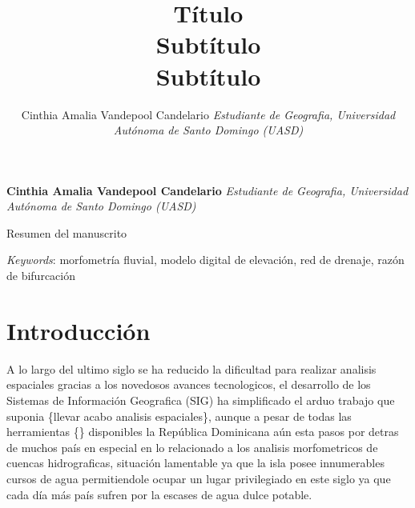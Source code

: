 \documentclass[11pt,]{article}
\title{Título\\
Subtítulo\\
Subtítulo  }
\author{\Large Cinthia Amalia Vandepool Candelario\vspace{0.05in} \newline\normalsize\emph{Estudiante de Geografia, Universidad Autónoma de Santo Domingo (UASD)}  }
\date{}
\newcommand*{\authorfont}{\fontfamily{phv}\selectfont}
\renewenvironment{abstract}
 {{%
    \setlength{\leftmargin}{0mm}
    \setlength{\rightmargin}{\leftmargin}%
  }%
  \relax}
 {\endlist}
\begin{document}
	
%

{%
\setlength{\parindent}{0pt}
\thispagestyle{plain}
{\fontsize{18}{20}\selectfont\raggedright 
\maketitle  %

}

{
   \vskip 13.5pt\relax \normalsize\fontsize{11}{12} 
\textbf{\authorfont Cinthia Amalia Vandepool Candelario} \hskip 15pt \emph{\small Estudiante de Geografia, Universidad Autónoma de Santo Domingo (UASD)}   

}

}








\begin{abstract}

    \hbox{\vrule height .2pt width 39.14pc}

    \vskip 8.5pt %

\noindent Resumen del manuscrito


\vskip 8.5pt \noindent \emph{Keywords}: morfometría fluvial, modelo digital de elevación, red de drenaje, razón
de bifurcación \par

    \hbox{\vrule height .2pt width 39.14pc}



\end{abstract}


\vskip 6.5pt


\noindent  \section{Introducción}\label{introducciuxf3n}

A lo largo del ultimo siglo se ha reducido la dificultad para realizar
analisis espaciales gracias a los novedosos avances tecnologicos, el
desarrollo de los Sistemas de Información Geografica (SIG) ha
simplificado el arduo trabajo que suponia \{llevar acabo analisis
espaciales\}, aunque a pesar de todas las herramientas \{\} disponibles
la República Dominicana aún esta pasos por detras de muchos país en
especial en lo relacionado a los analisis morfometricos de cuencas
hidrograficas, situación lamentable ya que la isla posee innumerables
cursos de agua permitiendole ocupar un lugar privilegiado en este siglo
ya que cada día más país sufren por la escases de agua dulce potable.
\end{document}
